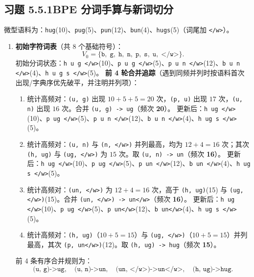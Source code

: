 \subsection*{习题 5.5.1\quad BPE 分词手算与新词切分}
微型语料为：\texttt{hug}(10)、\texttt{pug}(5)、\texttt{pun}(12)、\texttt{bun}(4)、\texttt{hugs}(5)（词尾加 \texttt{</w>}）。
\begin{enumerate}[label=(\alph*), leftmargin=1.8em]
  \item \textbf{初始字符词表}（共 8 个基础符号）：
  \[
    V_0 = \{\texttt{b},\; \texttt{g},\; \texttt{h},\; \texttt{n},\; \texttt{p},\; \texttt{s},\; \texttt{u},\; \texttt{</w>}\}.
  \]
  初始分词状态：\texttt{h u g </w>}(10)、\texttt{p u g </w>}(5)、\texttt{p u n </w>}(12)、\texttt{b u n </w>}(4)、\texttt{h u g s </w>}(5)。
  \textbf{前 4 轮合并追踪}（遇到同频并列时按语料首次出现/字典序优先破平，并注明并列项）：
  \begin{enumerate}[label=\textbf{第 \arabic* 轮：}, leftmargin=4.2em]
    \item 统计高频对：\texttt{(u, g)} 出现 $10+5+5=20$ 次，\texttt{(p, u)} 出现 $17$ 次，\texttt{(u, n)} 出现 $16$ 次。合并 \texttt{(u, g) -> ug}（频次 \textbf{20}）。
    更新后：\texttt{h ug </w>}(10)、\texttt{p ug </w>}(5)、\texttt{p u n </w>}(12)、\texttt{b u n </w>}(4)、\texttt{h ug s </w>}(5)。
    \item 统计高频对：\texttt{(u, n)} 与 \texttt{(n, </w>)} 并列最高，均为 $12+4=16$ 次；其次 \texttt{(h, ug)} 与 \texttt{(ug, </w>)} 为 $15$ 次。取 \texttt{(u, n) -> un}（频次 \textbf{16}）。
    更新后：\texttt{h ug </w>}(10)、\texttt{p ug </w>}(5)、\texttt{p un </w>}(12)、\texttt{b un </w>}(4)、\texttt{h ug s </w>}(5)。
    \item 统计高频对：\texttt{(un, </w>)} 为 $12+4=16$ 次，高于 \texttt{(h, ug)}(15) 与 \texttt{(ug, </w>)}(15)。合并 \texttt{(un, </w>) -> un</w>}（频次 \textbf{16}）。
    更新后：\texttt{h ug </w>}(10)、\texttt{p ug </w>}(5)、\texttt{p un</w>}(12)、\texttt{b un</w>}(4)、\texttt{h ug s </w>}(5)。
    \item 统计高频对：\texttt{(h, ug)}（$10+5=15$）与 \texttt{(ug, </w>)}（$10+5=15$）并列最高，其次 \texttt{(p, un</w>)}(12)。取 \texttt{(h, ug) -> hug}（频次 \textbf{15}）。
  \end{enumerate}
  前 4 条有序合并规则为：
  \[
    \texttt{(u, g)->ug},\quad \texttt{(u, n)->un},\quad \texttt{(un, </w>)->un</w>},\quad \texttt{(h, ug)->hug}.
  \]


\end{enumerate}

